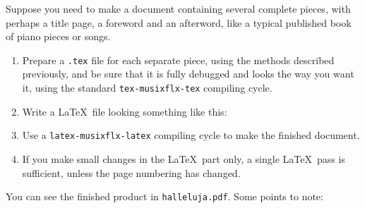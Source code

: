 \documentclass[11pt]{article}
\begin{document}
Suppose you need to make a document containing several complete
pieces, with
perhaps a title page, a foreword and an afterword, like a typical
published book of piano pieces or songs.  
\begin{enumerate}
  \item Prepare a \texttt{.tex} file for each separate piece, using the methods
described previously, and be sure that it is fully debugged and looks
the way you want it, using the standard \texttt{tex-musixflx-tex}
compiling cycle.
  \item Write a \LaTeX\ file looking something like this:

  \item Use a \texttt{latex-musixflx-latex}
compiling cycle to make the finished document.
  \item If you make small changes in the \LaTeX\ part only, a single
\LaTeX\ pass is sufficient, unless the page numbering has changed.
\end{enumerate}
You can see the finished product in \texttt{halleluja.pdf}.
Some points to note: 
\end{document}
